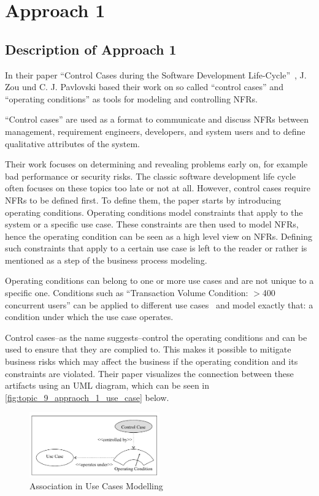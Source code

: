 \section{Approach 1} \label{sec:9_approach_1}


\subsection{Description of Approach 1}

In their paper \enquote{Control Cases during the Software Development Life-Cycle}~\cite{ZouPavlovski2008}, J. Zou und C. J. Pavlovski based their work on so called  \enquote{control cases} and \enquote{operating conditions} as tools for modeling and controlling NFRs.

\enquote{Control cases} are used as a format to communicate and discuss NFRs between management, requirement engineers, developers, and system users and to define qualitative attributes of the system.

Their work focuses on determining and revealing problems early on, for example bad performance or security risks.
The classic software development life cycle often focuses on these topics too late or not at all.
However, control cases require NFRs to be defined first.
To define them, the paper starts by introducing operating conditions.
Operating conditions model constraints that apply to the system or a specific use case. These constraints are then used to model NFRs, hence the operating condition can be seen as a high level view on NFRs.
Defining such constraints that apply to a certain use case is left to the reader or rather is mentioned as a step of the business process modeling.

Operating conditions can belong to one or more use cases and are not unique to a specific one. Conditions such as \enquote{Transaction Volume Condition: $>$400 concurrent users} can be applied to different use cases~\cite{ZouPavlovski2008} and model exactly that: a condition under which the use case operates.

Control cases--as the name suggests--control the operating conditions and can be used to ensure that they are complied to.
This makes it possible to mitigate business risks which may affect the business if the operating condition and its constraints are violated.
Their paper visualizes the connection between these artifacts using an UML diagram, which can be seen in \autoref{fig:topic_9_appraoch_1_use_case} below.

\begin{figure}[htbp]
	\centering
	\includegraphics[width=0.5\textwidth]{../images/topic_9_approach_1_1.png}
	\caption{Association in Use Cases Modelling~\cite{ZouPavlovski2008}}
	\label{fig:topic_9_appraoch_1_use_case}
\end{figure}

